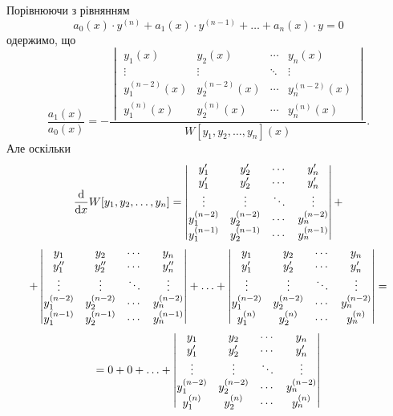 Порівнюючи з рівнянням 
\begin{equation}
	\label{eq:3.1.29}
	a_0(x) \cdot y^{(n)} + a_1(x) \cdot y^{(n - 1)} + \ldots + a_n(x) \cdot y = 0
\end{equation}
одержимо, що
\begin{equation}
	\label{eq:3.1.30}
	\frac{a_1(x)}{a_0(x)} = - \frac{\begin{vmatrix}
		y_1(x) & y_2(x) & \cdots & y_n(x) \\
		\vdots & \vdots & \ddots & \vdots \\
		y_1^{(n - 2)}(x) & y_2^{(n - 2)}(x) & \cdots & y_n^{(n - 2)}(x) \\
		y_1^{(n)}(x) & y_2^{(n)}(x) & \cdots & y_n^{(n)}(x)
	\end{vmatrix}}{W[y_1, y_2, \ldots, y_n](x)}.
\end{equation}
Але оскільки
\begin{multline}
	\label{eq:3.1.31}
	\frac{\mathop{}\!\mathrm{d}}{\mathop{}\!\mathrm{d} x} W[y_1, y_2, \ldots, y_n] = \begin{vmatrix}
		y_1' & y_2' & \cdots & y_n' \\
		y_1' & y_2' & \cdots & y_n' \\
		\vdots & \vdots & \ddots & \vdots \\
		y_1^{(n - 2)} & y_2^{(n - 2)} & \cdots & y_n^{(n - 2)} \\
		y_1^{(n - 1)} & y_2^{(n - 1)} & \cdots & y_n^{(n - 1)}
	\end{vmatrix} + \\ + \begin{vmatrix}
		y_1 & y_2 & \cdots & y_n \\
		y_1'' & y_2'' & \cdots & y_n'' \\
		\vdots & \vdots & \ddots & \vdots \\
		y_1^{(n - 2)} & y_2^{(n - 2)} & \cdots & y_n^{(n - 2)} \\
		y_1^{(n - 1)} & y_2^{(n - 1)} & \cdots & y_n^{(n - 1)}
	\end{vmatrix} + \ldots + \begin{vmatrix}
		y_1 & y_2 & \cdots & y_n \\
		y_1' & y_2' & \cdots & y_n' \\
		\vdots & \vdots & \ddots & \vdots \\
		y_1^{(n - 2)} & y_2^{(n - 2)} & \cdots & y_n^{(n - 2)} \\
		y_1^{(n)} & y_2^{(n)} & \cdots & y_n^{(n)}
	\end{vmatrix} = \\ = 0 + 0 + \ldots + \begin{vmatrix}
		y_1 & y_2 & \cdots & y_n \\
		y_1' & y_2' & \cdots & y_n' \\
		\vdots & \vdots & \ddots & \vdots \\
		y_1^{(n - 2)} & y_2^{(n - 2)} & \cdots & y_n^{(n - 2)}\\
		y_1^{(n)} & y_2^{(n)} & \cdots & y_n^{(n)}
	\end{vmatrix}
\end{multline}   
